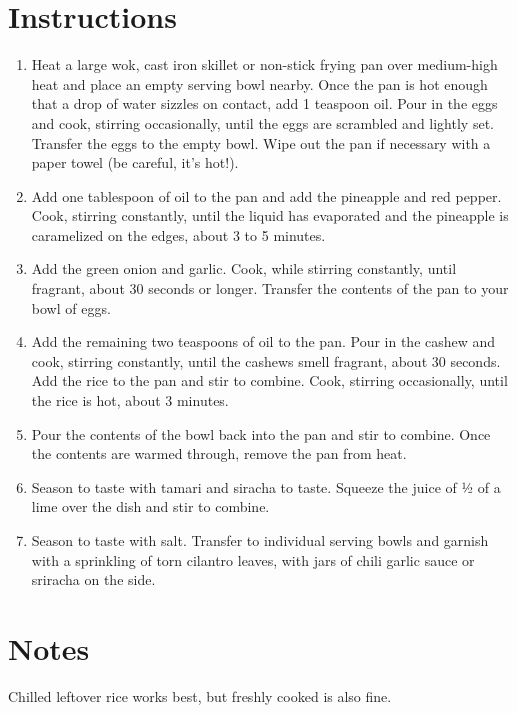 \documentclass[letterpaper,10pt,english]{sphinxmanual}
\begin{document}
\section{Instructions}
\label{\detokenize{PFR:instructions}}\begin{enumerate}
\item {} 
Heat a large wok, cast iron skillet or non-stick frying pan over medium-high heat and place an empty serving bowl nearby. Once the pan is hot enough that a drop of water sizzles on contact, add 1 teaspoon oil. Pour in the eggs and cook, stirring occasionally, until the eggs are scrambled and lightly set. Transfer the eggs to the empty bowl. Wipe out the pan if necessary with a paper towel (be careful, it’s hot!).

\item {} 
Add one tablespoon of oil to the pan and add the pineapple and red pepper. Cook, stirring constantly, until the liquid has evaporated and the pineapple is caramelized on the edges, about 3 to 5 minutes.

\item {} 
Add the green onion and garlic. Cook, while stirring constantly, until fragrant, about 30 seconds or longer. Transfer the contents of the pan to your bowl of eggs.

\item {} 
Add the remaining two teaspoons of oil to the pan. Pour in the cashew and cook, stirring constantly, until the cashews smell fragrant, about 30 seconds. Add the rice to the pan and stir to combine. Cook, stirring occasionally, until the rice is hot, about 3 minutes.

\item {} 
Pour the contents of the bowl back into the pan and stir to combine. Once the contents are warmed through, remove the pan from heat.

\item {} 
Season to taste with tamari and siracha to taste. Squeeze the juice of ½ of a lime over the dish and stir to combine.

\item {} 
Season to taste with salt. Transfer to individual serving bowls and garnish with a sprinkling of torn cilantro leaves, with jars of chili garlic sauce or sriracha on the side.

\end{enumerate}


\section{Notes}
\label{\detokenize{PFR:notes}}
Chilled leftover rice works best, but freshly cooked is also fine.
\end{document}
